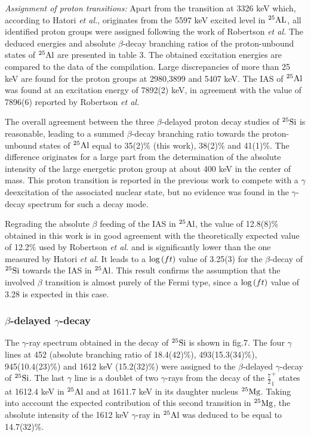 \documentclass[UTF8]{ctexart}
\begin{document}
\textit{Assignment of proton transitions:} Apart from the transition at 3326 keV which, according to Hatori \textit{et al.}, originates from the 5597 keV excited level in $^{25}\textnormal{AL}$, all identified proton groups were assigned following the work of Robertson \textit{et al.} The deduced energies and absolute $\beta$-decay branching ratios of the proton-unbound states of $^{25}\textnormal{Al}$ are presented in table 3. The obtained excitation energies are compared to the data of the compilation. Large discrepancies of more than 25 keV are found for the proton groups at 2980,3899 and 5407 keV. The IAS of $^{25}\textnormal{Al}$ was found at an excitation energy of 7892(2) keV, in agreement with the value of 7896(6) reported by Robertson \textit{et al.} 

The overall agreement between the three $\beta$-delayed proton decay studies of $^{25}\textnormal{Si}$ is reasonable, leading to a summed $\beta$-decay branching ratio towards the proton-unbound states of $^{25}\textnormal{Al}$ equal to 35(2)\% (this work), 38(2)\% and 41(1)\%. The difference originates for a large part from the determination of the absolute intensity of the large energetic proton group at about 400 keV in the center of mass. This proton transition is reported in the previous work to compete with a $\gamma$ deexcitation of the associated nuclear state, but no evidence was found in the $\gamma$-decay spectrum for such a decay mode.

Regrading the absolute $\beta$ feeding of the IAS in $^{25}\textnormal{Al}$, the value of 12.8(8)\% obtained in this work is in good agreement with the theoretically expected value of 12.2\% used by Robertson \textit{et al.} and is significantly lower than the one measured by Hatori \textit{et al.} It leads to a $\textnormal{log}\left( ft \right)$ value of 3.25(3) for the $\beta$-decay of $^{25}\textnormal{Si}$ towards the IAS in $^{25}\textnormal{Al}$. This result confirms the assumption that the involved $\beta$ transition is almost purely of the Fermi type, since a $\textnormal{log}\left( ft \right)$ value of 3.28 is expected in this case.

\subsubsection{$\beta$-delayed $\gamma$-decay}
The $\gamma$-ray spectrum obtained in the decay of $^{25}\textnormal{Si}$ is shown in fig.7. The four $\gamma$ lines at 452 (absolute branching ratio of 18.4(42)\%), 493(15.3(34)\%), 945(10.4(23)\%) and 1612 keV (15.2(32)\%) were assigned to the $\beta$-delayed $\gamma$-decay of $^{25}\textnormal{Si}$. The last $\gamma$ line is a doublet of two $\gamma$-rays from the decay of the $\frac{7}{2}_{1}^{+}$ states at 1612.4 keV in $^{25}\textnormal{Al}$ and at 1611.7 keV in its daughter nucleus $^{25}\textnormal{Mg}$. Taking into acccount the expected contribution of this second transition in $^{25}\textnormal{Mg}$, the absolute intensity of the 1612 keV $\gamma$-ray in $^{25}\textnormal{Al}$ was deduced to be equal to 14.7(32)\%.
\end{document}
